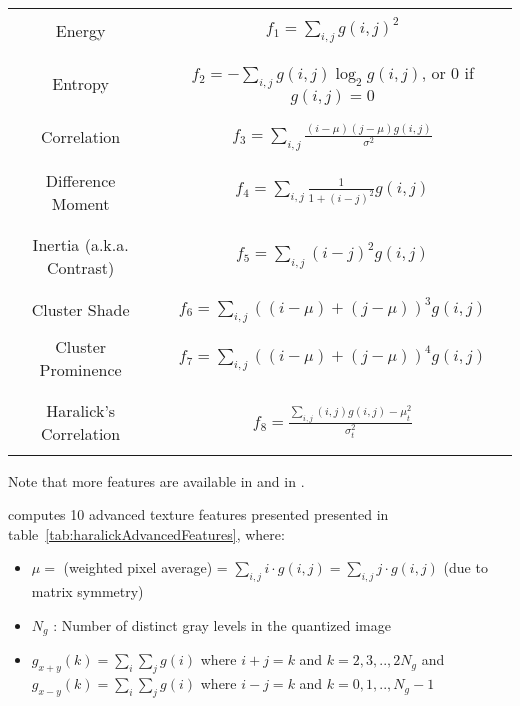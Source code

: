 \begin{table}
\begin{center}
\begin{tabular}[h!]{|c|c|}
\hline
& \\
Energy & $ f_1 = \sum_{i,j}g(i, j)^2 $ \\
& \\
\hline
& \\
Entropy & $ f_2 = -\sum_{i,j}g(i, j) \log_2 g(i, j)$, or 0 if $g(i, j) = 0$ \\
& \\
\hline
& \\
Correlation & $ f_3 = \sum_{i,j}\frac{(i - \mu)(j - \mu)g(i, j)}{\sigma^2} $ \\
& \\
\hline
& \\
Difference Moment &  $f_4 = \sum_{i,j}\frac{1}{1 + (i - j)^2}g(i, j) $ \\
& \\
\hline
& \\
Inertia (a.k.a. Contrast) & $ f_5 = \sum_{i,j}(i - j)^2g(i, j) $ \\
& \\
\hline
& \\
Cluster Shade & $ f_6 = \sum_{i,j}((i - \mu) + (j - \mu))^3 g(i, j) $ \\
& \\
\hline
Cluster Prominence & $ f_7 = \sum_{i,j}((i - \mu) + (j - \mu))^4 g(i, j) $ \\
& \\
\hline
& \\
Haralick's Correlation & $ f_8 = \frac{\sum_{i,j}(i, j) g(i, j) -\mu_t^2}{\sigma_t^2} $ \\
& \\
\hline
\end{tabular}
\end{center}
\label{tab:haralickStandardFeatures}
\end{table}

Note that more features are available in
 and in
.

 computes 10 advanced
texture features presented presented in table~\ref{tab:haralickAdvancedFeatures},
where:

\begin{itemize}

\item $ \mu = $  (weighted pixel average) = $ \sum_{i, j}i \cdot g(i, j) =
  \sum_{i,j}j \cdot g(i, j) $ (due to matrix symmetry)
\item $N_{g}$ : Number of distinct gray levels in the quantized image
\item $ g_{x+y}(k) = \sum_{i}\sum_{j}g(i) $ where $ i+j=k $ and $ k = 2, 3, .., 2N_{g} $ and $ g_{x-y}(k) =  \sum_{i}\sum_{j}g(i) $ where $ i-j=k $ and $ k = 0, 1, ..,N_{g}-1 $

\end{itemize}

